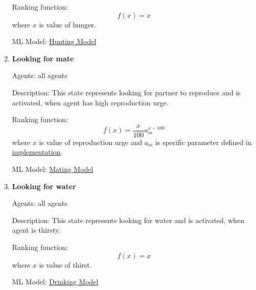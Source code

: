 \begin{enumerate}
    Ranking function:
    \begin{equation}
        f(x) = x
    \end{equation}
    where $x$ is value of hunger.
    
    ML Model: \hyperref[huntingModel]{Hunting Model}
    
    \item \textbf{Looking for mate}
    
    Agents: all agents
    
    Description: This state represents looking for partner to reproduce and is activated, when agent has high reproduction urge.
    
    Ranking function:
    \begin{equation}
        f(x) = \frac{x}{100}a_m^{x-100}
    \end{equation}
    where $x$ is value of reproduction urge and $a_m$ is specific parameter defined in \hyperref[featuresNeedsStatesImplementation]{implementation}.
    
    ML Model: \hyperref[matingModel]{Mating Model}
    
    \item \textbf{Looking for water}
    
    Agents: all agents
    
    Description: This state represents looking for water and is activated, when agent is thirsty.
    
    Ranking function:
    \begin{equation}
        f(x) = x
    \end{equation}
    where $x$ is value of thirst.
    
    ML Model: \hyperref[drinkingModel]{Drinking Model}
    
\end{enumerate}

